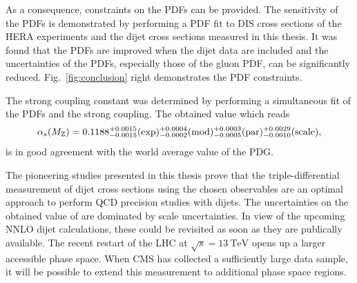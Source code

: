 As a consequence, constraints on the PDFs can be provided. The sensitivity of
the PDFs is demonstrated by performing a PDF fit to DIS cross sections of the
HERA experiments and the dijet cross sections measured in this thesis. It was
found that the PDFs are improved when the dijet data are included and the
uncertainties of the PDFs, especially those of the gluon PDF, can be
significantly reduced. Fig.~\ref{fig:conclusion} right demonstrates the PDF
constraints.

The strong coupling constant \asmz was determined by performing a simultaneous
fit of the PDFs and the strong coupling. The obtained value which reads
%
\begin{equation*}
  \alpha_{s}(M_\mathrm{Z}) = 0.1188_{-0.0015}^{+0.0015}(\mathrm{exp})_{-0.0002}^{+0.0004}(\mathrm{mod})_{-0.0005}^{+0.0003}(\mathrm{par})_{-0.0010}^{+0.0029}(\mathrm{scale}),
\end{equation*}
%
is in good agreement with the world average value of the PDG. 

The pioneering studies presented in this thesis prove that the triple-differential
measurement of dijet cross sections using the chosen observables are an optimal
approach to perform QCD precision studies with dijets. The uncertainties on the
obtained value of \asmz are dominated by scale uncertainties. In view of
the upcoming NNLO dijet calculations, these could be revisited as soon as they
are publically available. The recent
restart of the LHC at $\sqrt{s}=\SI{13}{\TeV}$ opens up a larger accessible
phase space. When CMS has collected a sufficiently large data sample, it will be
possible to extend this measurement to additional phase space regions.

